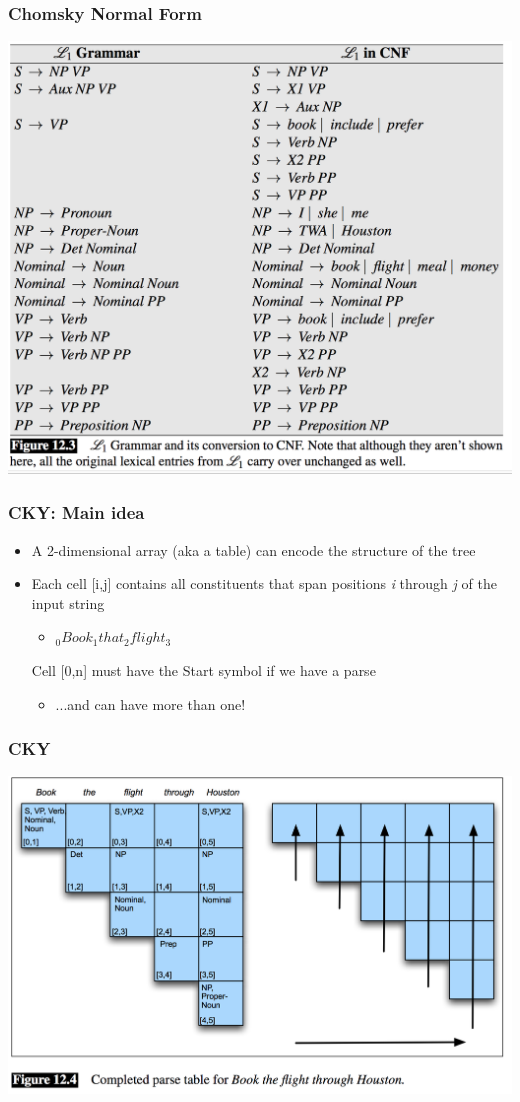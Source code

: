 \documentclass{beamer}
\begin{document}
\begin{frame}
\frametitle{Chomsky Normal Form}
\includegraphics[width=\textwidth]{figures/CNF}
\end{frame}

\begin{frame}
\frametitle{CKY: Main idea}
\begin{itemize}
\item A 2-dimensional array (aka a table) can encode the structure of the tree
\item Each cell [i,j] contains all constituents that span positions {\it i} through {\it j} of the input string
\begin{itemize}
\item $_0Book_1that_2flight_3$
\end{itemize}
Cell [0,n] must have the Start symbol if we have a parse
\begin{itemize}
\item ...and can have more than one!
\end{itemize}
\end{itemize}
\end{frame}


\begin{frame}
\frametitle{CKY}
\includegraphics[width=\textwidth]{figures/cky1}
\end{frame}
\end{document}
